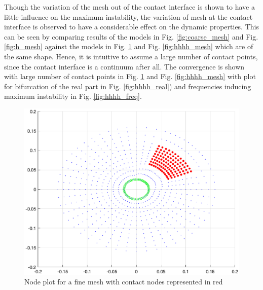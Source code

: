 Though the variation of the mesh out of the contact interface is shown to have a little influence on the maximum instability, the variation of mesh at the contact interface is observed to have a considerable effect on the dynamic properties. This can be seen by comparing results of the models in Fig. \ref{fig:coarse_mesh} and Fig. \ref{fig:h_mesh} against the models in Fig. \ref{fig:hh_mesh} and Fig. \ref{fig:hhhh_mesh} which are of the same shape. Hence, it is intuitive to assume a large number of contact points, since the contact interface is a continuum after all. The convergence is shown with large number of contact points in Fig. \ref{fig:hh_mesh} and Fig. \ref{fig:hhhh_mesh} with plot for bifurcation of the real part in Fig. \ref{fig:hhhh_real}) and frequencies inducing maximum instability in Fig. \ref{fig:hhhh_freq}. \\

\begin{figure}
    \centering
    \includegraphics[scale=0.43]{Chapter2/Pictures/Geo_pub_hh.eps}
    \caption{Node plot for a fine mesh with contact nodes represented in red}
    \label{fig:hh_mesh}
\end{figure}

